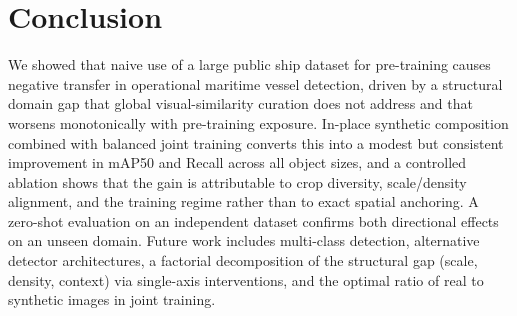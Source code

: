\documentclass[10pt,conference]{IEEEtran}
\newif\iffinal
\begin{document}
\section{Conclusion}
We showed that naive use of a large public ship dataset for pre-training causes
negative transfer in operational maritime vessel detection, driven by a structural
domain gap that global visual-similarity curation does not address and that
worsens monotonically with pre-training exposure. In-place synthetic composition
combined with balanced joint training converts this into a modest but consistent
improvement in mAP50 and Recall across all object sizes, and a controlled ablation shows that
the gain is attributable to crop diversity, scale/density alignment, and the
training regime rather than to exact spatial anchoring. A zero-shot evaluation on
an independent dataset confirms both directional effects on an unseen domain.
Future work includes multi-class detection, alternative detector architectures, a factorial decomposition of the structural gap (scale, density, context) via single-axis interventions, and the optimal ratio of real to synthetic images in joint training.

\iffinal
\section*{Acknowledgment}
\fi



\end{document}
